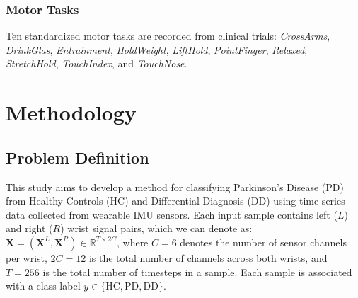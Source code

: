 \documentclass[conference]{IEEEtran}
\begin{document}
\subsubsection{Motor Tasks}
Ten standardized motor tasks are recorded from clinical trials: \textit{CrossArms}, \textit{DrinkGlas}, \textit{Entrainment}, \textit{HoldWeight}, \textit{LiftHold}, \textit{PointFinger}, \textit{Relaxed}, \textit{StretchHold}, \textit{TouchIndex}, and \textit{TouchNose}. 


\section{Methodology}

\subsection{Problem Definition}

This study aims to develop a method for classifying Parkinson's Disease (PD) from Healthy Controls (HC) and Differential Diagnosis (DD) using time-series data collected from wearable IMU sensors.
Each input sample contains left ($L$) and right ($R$) wrist signal pairs, which we can denote as:
$\mathbf{X} = (\mathbf{X}^L, \mathbf{X}^R) \in \mathbb{R}^{T \times 2C}$,
where $C{=}6$ denotes the number of sensor channels per wrist, $2C{=}12$ is the total number of channels across both wrists, and $T{=}256$ is the total number of timesteps in a sample.
Each sample is associated with a class label $y \in \{\text{HC}, \text{PD}, \text{DD}\}$.
\end{document}
